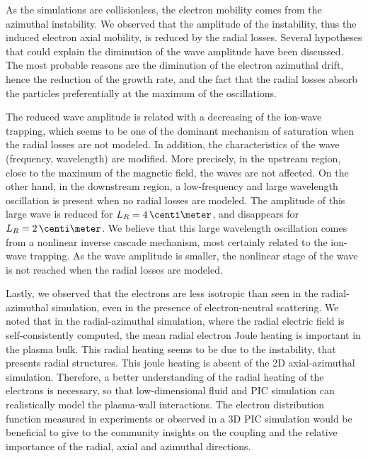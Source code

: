 As the simulations are collisionless, the electron mobility comes from the azimuthal instability.
We observed that the amplitude of the instability, thus the induced electron axial mobility, is reduced by the radial losses.
Several hypotheses that could explain the diminution of the wave amplitude have been discussed.
The most probable reasons are the diminution of the electron azimuthal drift, hence the reduction of the growth rate, and the fact that the radial losses absorb the particles preferentially at the maximum of the oscillations.

The reduced wave amplitude is related with a decreasing of the ion-wave trapping, which seems to be one of the dominant mechanism of saturation when the radial losses are not modeled.
In addition, the characteristics of the wave (frequency, wavelength) are modified.
More precisely, in the upstream region, close to the maximum of the magnetic field, the waves are not affected.
On the other hand,  in the downstream region, a low-frequency and large wavelength oscillation is present when no radial losses are modeled.
The amplitude of this large wave is reduced for $L_R=4\,\centi\meter$, and disappears for $L_R=2\,\centi\meter$.
We believe that this large wavelength oscillation comes from a nonlinear inverse cascade mechanism, most certainly related to the ion-wave trapping.
As the wave amplitude is smaller, the nonlinear stage of the wave is not reached when the radial losses are modeled.


\vspace{1em}
Lastly, we observed that the electrons are less isotropic than seen in the radial-azimuthal simulation, even in the presence of electron-neutral scattering.
We noted that in the radial-azimuthal simulation, where the radial electric field is self-consistently computed, the mean radial electron Joule heating is important in the plasma bulk.
This radial heating seems to be due to the instability, that presents radial structures.
This joule heating is absent of the \ac{2D} axial-azimuthal simulation.
Therefore, a better understanding of the radial heating of the electrons is necessary, so that low-dimensional fluid and \ac{PIC} simulation can realistically model the plasma-wall interactions.
The electron distribution function measured in experiments or observed in a \ac{3D} \ac{PIC} simulation would be beneficial to give to the community insights on the coupling and the relative importance of the radial, axial and azimuthal directions.

